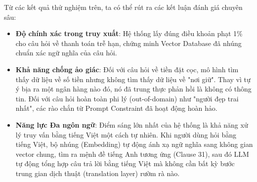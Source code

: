 Từ các kết quả thử nghiệm trên, ta có thể rút ra các kết luận đánh giá chuyên sâu:
\begin{itemize}
    \item \textbf{Độ chính xác trong truy xuất}: Hệ thống lấy đúng điều khoản phạt 1\% cho câu hỏi về thanh toán trễ hạn, chứng minh Vector Database đã nhúng chuẩn xác ngữ nghĩa của câu hỏi.
    \item \textbf{Khả năng chống ảo giác}: Đối với câu hỏi về tiền đặt cọc, mô hình tìm thấy dữ liệu về số tiền nhưng không tìm thấy dữ liệu về "nơi giữ". Thay vì tự ý bịa ra một ngân hàng nào đó, nó đã trung thực phản hồi là không có thông tin. Đối với câu hỏi hoàn toàn phi lý (out-of-domain) như "người đẹp trai nhất", các rào chắn từ Prompt Constraint đã hoạt động hoàn hảo.
    \item \textbf{Năng lực Đa ngôn ngữ}: Điểm sáng lớn nhất của hệ thống là khả năng xử lý truy vấn bằng tiếng Việt một cách tự nhiên. Khi người dùng hỏi bằng tiếng Việt, bộ nhúng (Embedding) tự động ánh xạ ngữ nghĩa sang không gian vector chung, tìm ra mệnh đề tiếng Anh tương ứng (Clause 31), sau đó LLM tự động tổng hợp câu trả lời bằng tiếng Việt mà không cần bất kỳ bước trung gian dịch thuật (translation layer) rườm rà nào.
\end{itemize}
